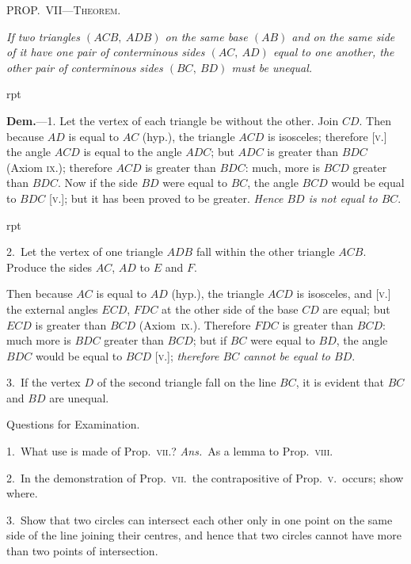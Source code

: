 \documentclass[oneside]{book}
\newcounter{wrapwidth}
\newcommand\mypropl[2]{
\bigskip\Needspace*{4\baselineskip}\begin{center}\textsc{#1}\end{center}
\hspace{\parindent}\emph{#2}\par\medskip
}
\newcommand\exhead[1]{
\Needspace*{5\baselineskip}\begin{center}
\textsf{#1}
\end{center}
}
\newcommand\imgflow[3]{
\setcounter{wrapwidth}{#1}

\begin{wrapfigure}[#2]{r}{\value{wrapwidth}pt}
\begin{center}
\vspace{-0.3in}

\end{center}
\end{wrapfigure}
}
\begin{document}
\mypropl{PROP\@.~VII---Theorem.}{If two triangles $(ACB,\ ADB)$ on the same base $(AB)$
and on the same side of it have one pair of conterminous
sides $(AC,\ AD)$ equal to one another, the other pair of
conterminous sides $(BC,\ BD)$ must be unequal.}


\imgflow{80}{8}{f020}

\textbf{Dem.}---1. Let the vertex of each triangle be without
the other. Join $CD$. Then because
$AD$ is equal to $AC$ (hyp.), the triangle
$ACD$ is isosceles; therefore [\textsc{v.}] the
angle $ACD$ is equal to the angle $ADC$;
but $ADC$ is greater than $BDC$ (Axiom
\textsc{ix.}); therefore $ACD$ is greater than
$BDC$: much, more is $BCD$ greater
than $BDC$. Now if the side $BD$ were
equal to $BC$, the angle $BCD$ would be
equal to $BDC$ [\textsc{v.}]; but it has been proved to be
greater. \emph{Hence $BD$ is not equal to $BC$}.


\imgflow{160}{10}{f021}

2.~Let the vertex of one triangle $ADB$ fall within the
other triangle $ACB$. Produce the sides $AC$, $AD$ to $E$ and $F$.

Then because $AC$ is equal to $AD$ (hyp.), the triangle $ACD$
is isosceles, and [\textsc{v.}] the
external angles $ECD$,
$FDC$ at the other side of
the base $CD$ are equal;
but $ECD$ is greater than
$BCD$ (Axiom~\textsc{ix.}). Therefore
$FDC$ is greater than
$BCD$: much more is
$BDC$ greater than $BCD$;
but if $BC$ were equal
to $BD$, the angle $BDC$ would be equal to $BCD$ [\textsc{v.}];
\textit{therefore $BC$ cannot be equal to $BD$}.

3.~If the vertex $D$ of the second triangle fall on the
line $BC$, it is evident that $BC$ and $BD$ are unequal.


\exhead{Questions for Examination.}

\begin{footnotesize}
1.~What use is made of Prop.~\textsc{vii.}? \textit{Ans.}\ As a lemma to
Prop.~\textsc{viii.}

2.~In the demonstration of Prop.~\textsc{vii.}\ the contrapositive of
Prop.~\textsc{v.}\ occurs; show where.

3.~Show that two circles can intersect each other only in one
point on the same side of the line joining their centres, and hence
that two circles cannot have more than two points of intersection.
\par\end{footnotesize}
\end{document}
